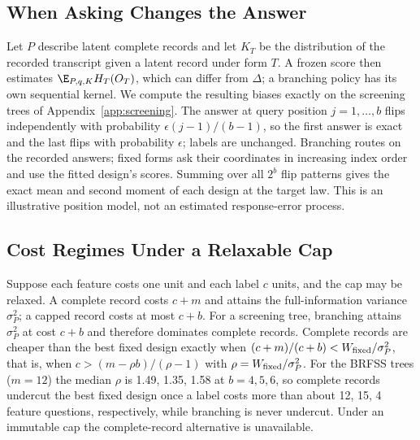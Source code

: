\subsection{When Asking Changes the Answer}\label{app:measurement}
Let $P$ describe latent complete records and let $K_T$ be the distribution of the recorded transcript given a latent record under form $T$. A frozen score then estimates $\E_{P,q,K}H_T(O_T)$, which can differ from $\Delta$; a branching policy has its own sequential kernel. We compute the resulting biases exactly on the screening trees of Appendix~\ref{app:screening}. The answer at query position $j=1,\ldots,b$ flips independently with probability $\epsilon(j-1)/(b-1)$, so the first answer is exact and the last flips with probability $\epsilon$; labels are unchanged. Branching routes on the recorded answers; fixed forms ask their coordinates in increasing index order and use the fitted design's scores. Summing over all $2^b$ flip patterns gives the exact mean and second moment of each design at the target law. This is an illustrative position model, not an estimated response-error process.


\subsection{Cost Regimes Under a Relaxable Cap}\label{app:costchoice}
Suppose each feature costs one unit and each label $c$ units, and the cap may be relaxed. A complete record costs $c+m$ and attains the full-information variance $\sigma_P^2$; a capped record costs at most $c+b$. For a screening tree, branching attains $\sigma_P^2$ at cost $c+b$ and therefore dominates complete records. Complete records are cheaper than the best fixed design exactly when $(c+m)/(c+b)<W_{\rm fixed}/\sigma_P^2$, that is, when $c>(m-\rho b)/(\rho-1)$ with $\rho=W_{\rm fixed}/\sigma_P^2$. For the BRFSS trees ($m=12$) the median $\rho$ is 1.49, 1.35, 1.58 at $b=4, 5, 6$, so complete records undercut the best fixed design once a label costs more than about 12, 15, 4 feature questions, respectively, while branching is never undercut. Under an immutable cap the complete-record alternative is unavailable.

